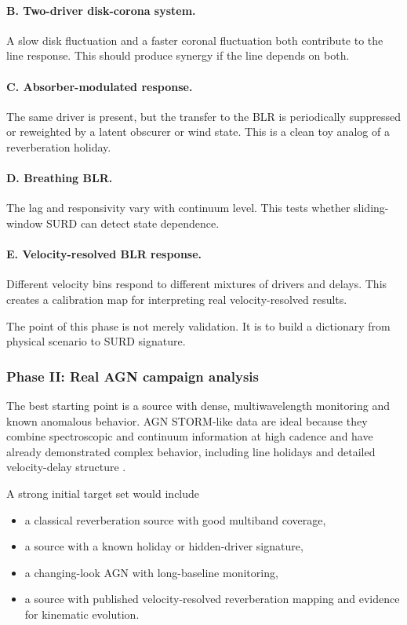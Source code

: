 \documentclass{article}
\begin{document}
\paragraph{B. Two-driver disk-corona system.}
A slow disk fluctuation and a faster coronal fluctuation both contribute to the line response. This should produce synergy if the line depends on both.

\paragraph{C. Absorber-modulated response.}
The same driver is present, but the transfer to the BLR is periodically suppressed or reweighted by a latent obscurer or wind state. This is a clean toy analog of a reverberation holiday.

\paragraph{D. Breathing BLR.}
The lag and responsivity vary with continuum level. This tests whether sliding-window SURD can detect state dependence.

\paragraph{E. Velocity-resolved BLR response.}
Different velocity bins respond to different mixtures of drivers and delays. This creates a calibration map for interpreting real velocity-resolved results.

The point of this phase is not merely validation. It is to build a dictionary from physical scenario to SURD signature.

\subsubsection{Phase II: Real AGN campaign analysis}

The best starting point is a source with dense, multiwavelength monitoring and known anomalous behavior. AGN STORM-like data are ideal because they combine spectroscopic and continuum information at high cadence and have already demonstrated complex behavior, including line holidays and detailed velocity-delay structure \cite{CackettHorneWinkler2021,Dehghanian2019}.

A strong initial target set would include
\begin{itemize}
    \item a classical reverberation source with good multiband coverage,
    \item a source with a known holiday or hidden-driver signature,
    \item a changing-look AGN with long-baseline monitoring,
    \item a source with published velocity-resolved reverberation mapping and evidence for kinematic evolution.
\end{itemize}
\end{document}
